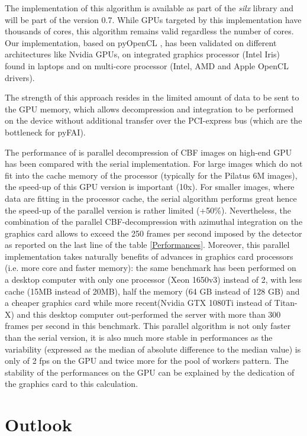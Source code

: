 \documentclass[preprint]{iucr}              %
\begin{document}
The implementation of this algorithm is available as part of the \textit{silx}
\cite{silx} library and will be part of the version 0.7.
While GPUs targeted by this implementation have thousands of
cores, this algorithm remains valid regardless the
number of cores.
Our implementation, based on pyOpenCL \cite{pyopencl}, 
has been validated on different architectures like Nvidia GPUs, on 
integrated graphics processor (Intel Iris) found in laptops and on multi-core
processor (Intel, AMD and Apple OpenCL drivers). 

The strength of this approach resides in the limited amount of
data to be sent to the GPU memory, which allows decompression and
integration to be performed on the device without additional
transfer over the PCI-express bus (which are the bottleneck for pyFAI).

The performance of is parallel decompression of CBF images on high-end GPU has
been compared with the serial implementation. 
For large images which do not fit into the cache memory of the
processor (typically for the Pilatus 6M images), the speed-up of this GPU
version is important (10x).
For smaller images, where data are fitting in the processor cache, the serial
algorithm performs great hence the speed-up of the parallel version is
rather limited (+50\%). 
Nevertheless, the combination of the parallel CBF-decompression with azimuthal
integration on the graphics card allows to exceed the 250 frames per second
imposed by the detector as reported on the last line of the table
\ref{Performances}.
Moreover, this parallel implementation takes naturally benefits of advances in
graphics card processors (i.e. more core and faster memory): 
the same benchmark has been performed on a desktop computer with only one
processor (Xeon 1650v3) instead of 2, with less cache (15MB instead of 20MB),
half the memory (64 GB instead of 128 GB) and a cheaper graphics card while more
recent(Nvidia GTX 1080Ti instead of Titan-X) and this desktop computer
out-performed the server with more than 300 frames per second in this benchmark.
This parallel algorithm is not only faster than the serial version, it is also
much more stable in performances as the variability (expressed
as the median of absolute difference to the median value) is only of 2 fps on 
the GPU and twice more for the pool of workers pattern. 
The stability of the performances on the GPU can be explained by the dedication
of the graphics card to this calculation.

\section{Outlook}
\end{document}
